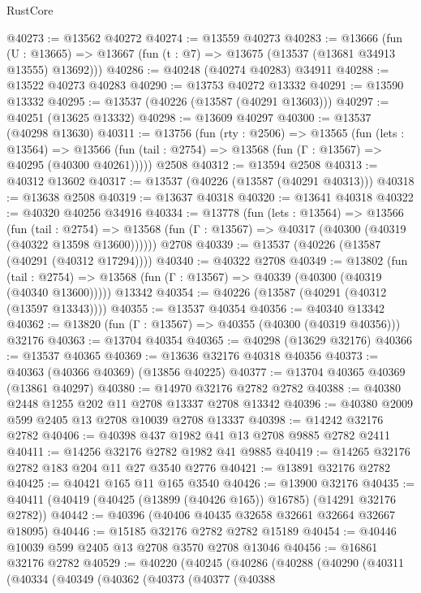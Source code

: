 \begin{lexlean}{RustCore}
\begin{coremodule}
@40273 := @13562 @40272
@40274 := @13559 @40273
@40283 := @13666
    (fun (U : @13665) => @13667 (fun (t : @7) => @13675 (@13537 (@13681 @34913 @13555) @13692)))
@40286 := @40248 (@40274 @40283) @34911
@40288 := @13522 @40273 @40283
@40290 := @13753 @40272 @13332
@40291 := @13590 @13332
@40295 := @13537 (@40226 (@13587 (@40291 @13603)))
@40297 := @40251 (@13625 @13332)
@40298 := @13609 @40297
@40300 := @13537 (@40298 @13630)
@40311 := @13756
    (fun (rty : @2506) =>
    @13565
      (fun (lets : @13564) =>
      @13566 (fun (tail : @2754) => @13568 (fun (Γ : @13567) => @40295 (@40300 @40261)))))
    @2508
@40312 := @13594 @2508
@40313 := @40312 @13602
@40317 := @13537 (@40226 (@13587 (@40291 @40313)))
@40318 := @13638 @2508
@40319 := @13637 @40318
@40320 := @13641 @40318
@40322 := @40320 @40256 @34916
@40334 := @13778
    (fun (lets : @13564) =>
    @13566
      (fun (tail : @2754) =>
      @13568 (fun (Γ : @13567) => @40317 (@40300 (@40319 (@40322 @13598 @13600))))))
    @2708
@40339 := @13537 (@40226 (@13587 (@40291 (@40312 @17294))))
@40340 := @40322 @2708
@40349 := @13802
    (fun (tail : @2754) => @13568 (fun (Γ : @13567) => @40339 (@40300 (@40319 (@40340 @13600)))))
    @13342
@40354 := @40226 (@13587 (@40291 (@40312 (@13597 @13343))))
@40355 := @13537 @40354
@40356 := @40340 @13342
@40362 := @13820 (fun (Γ : @13567) => @40355 (@40300 (@40319 @40356))) @32176
@40363 := @13704 @40354
@40365 := @40298 (@13629 @32176)
@40366 := @13537 @40365
@40369 := @13636 @32176 @40318 @40356
@40373 := @40363 (@40366 @40369) (@13856 @40225)
@40377 := @13704 @40365 @40369 (@13861 @40297)
@40380 := @14970 @32176 @2782 @2782
@40388 := @40380 @2448 @1255 @202 @11 @2708 @13337 @2708 @13342
@40396 := @40380 @2009 @599 @2405 @13 @2708 @10039 @2708 @13337
@40398 := @14242 @32176 @2782
@40406 := @40398 @437 @1982 @41 @13 @2708 @9885 @2782 @2411
@40411 := @14256 @32176 @2782 @1982 @41 @9885
@40419 := @14265 @32176 @2782 @183 @204 @11 @27 @3540 @2776
@40421 := @13891 @32176 @2782
@40425 := @40421 @165 @11 @165 @3540
@40426 := @13900 @32176
@40435 := @40411 (@40419 (@40425 (@13899 (@40426 @165)) @16785) (@14291 @32176 @2782))
@40442 := @40396 (@40406 @40435 @32658 @32661 @32664 @32667 @18095)
@40446 := @15185 @32176 @2782 @2782 @15189
@40454 := @40446 @10039 @599 @2405 @13 @2708 @3570 @2708 @13046
@40456 := @16861 @32176 @2782
@40529 := @40220
    (@40245
      (@40286
        (@40288
          (@40290
            (@40311
              (@40334
                (@40349
                  (@40362
                    (@40373
                      (@40377
                        (@40388

\end{coremodule}
\end{lexlean}
